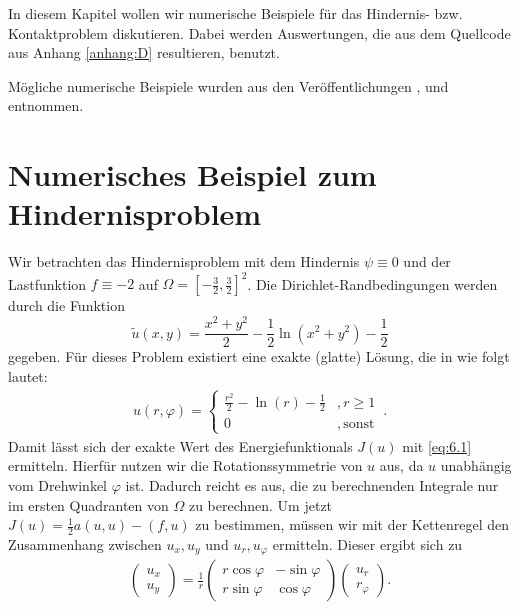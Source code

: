 \label{kap:6}


In diesem Kapitel wollen wir numerische Beispiele für das Hindernis- bzw. Kontaktproblem diskutieren. Dabei werden Auswertungen, die aus dem Quellcode aus Anhang \ref{anhang:D} resultieren, benutzt.

Mögliche numerische Beispiele wurden aus den Veröffentlichungen \cite{SiebVee}, \cite{BraeCar} und \cite{CarWri} entnommen.


\section{Numerisches Beispiel zum Hindernisproblem}
\label{kap:6.1}

\begin{bsp}\label{bsp:6.1}
Wir betrachten das Hindernisproblem mit dem Hindernis $\psi \equiv 0$ und der Lastfunktion $f\equiv -2$ auf $\Omega = [-\frac 32,\frac 32]^2$. Die Dirichlet-Randbedingungen werden durch die Funktion
\[
	\tilde u(x,y) = \frac{x^2+y^2}2-\frac 12 \ln(x^2+y^2)-\frac 12
\]
gegeben. Für dieses Problem existiert eine exakte (glatte) Lösung, die in  wie folgt lautet:
\begin{align}\label{eq:6.1}
	u(r,\varphi) = \begin{cases}
					\frac{r^2}2-\ln (r)-\frac 12 & , r \ge 1 \\
					0 & , \, \text{sonst}
				\end{cases} \, .
\end{align}
Damit lässt sich der exakte Wert des Energiefunktionals $J(u)$ mit \eqref{eq:6.1} ermitteln. Hierfür nutzen wir die Rotationssymmetrie von $u$ aus, da $u$ unabhängig vom Drehwinkel $\varphi$ ist. Dadurch reicht es aus, die zu berechnenden Integrale nur im ersten Quadranten von $\Omega$ zu berechnen. Um jetzt $J(u)= \frac 12 a(u,u)-(f,u)$ zu bestimmen, müssen wir mit der Kettenregel den Zusammenhang zwischen $u_x,u_y$ und $u_r,u_\varphi$ ermitteln. Dieser ergibt sich zu
\begin{align}\label{eq:6.2}
	\begin{pmatrix} u_x \\ u_y \end{pmatrix} = \frac 1r \begin{pmatrix} r \cos \varphi & -\sin\varphi \\ r \sin\varphi & \cos\varphi \end{pmatrix} \begin{pmatrix} u_r \\ r_\varphi \end{pmatrix}.
\end{align}


\end{bsp}
